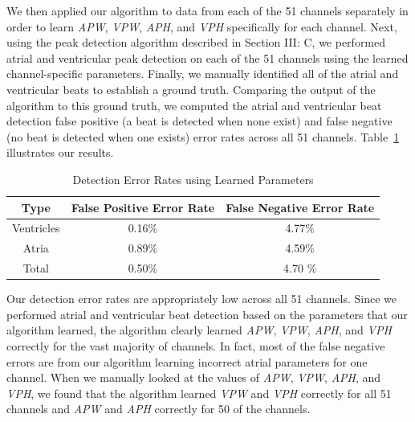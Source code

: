 \documentclass[conference]{IEEEtran}
\newcommand{\APW}{\textit{APW}}
\newcommand{\VPW}{\textit{VPW}}
\newcommand{\APH}{\textit{APH}}
\newcommand{\VPH}{\textit{VPH}}
\begin{document}
We then applied our algorithm to data
from each of the 51 channels separately in order to learn
\APW{}, \VPW{}, \APH{}, and \VPH{} specifically for each
channel. Next, using the peak detection algorithm
described in Section III: C, we performed atrial and
ventricular peak detection on each of the 51 channels
using the learned channel-specific parameters.
Finally, we manually identified all of the atrial and ventricular beats to establish a ground truth. 
Comparing the output of the algorithm to this ground truth, we computed the
atrial and ventricular beat detection 
false positive (a beat is detected when none
exist) and false negative (no beat is detected when one
exists) error rates across all 51 channels.
Table~\ref{tab:errors} illustrates our results.
\begin{table}[h]
	\caption{Detection Error Rates using Learned Parameters}
	\label{tab:errors}
	\centering
	\begin{tabular}{|c|c|c|}
		\hline
		Type & False Positive Error Rate & False Negative Error Rate \\
		\hline 
		Ventricles & 0.16\% &4.77\% \\
		\hline
		Atria & 0.89\% & 4.59\% \\
		\hline
		Total & 0.50\% & 4.70 \% \\
		\hline
	\end{tabular}
\end{table}

Our detection error rates are appropriately low across %
all 51 channels. Since we performed atrial and
ventricular beat detection based on the parameters that
our algorithm learned, the algorithm clearly learned
\APW{}, \VPW{}, \APH{}, and \VPH{} correctly for the vast
majority of channels. In fact, most of the false negative
errors are from our algorithm learning incorrect
atrial parameters for one channel. When we manually
looked at the values of \APW{}, \VPW{}, \APH{}, and \VPH{}, we
found that the algorithm learned \VPW{} and \VPH{} correctly
for all 51 channels and \APW{} and \APH{} correctly for 50 of %
the channels.
\end{document}
